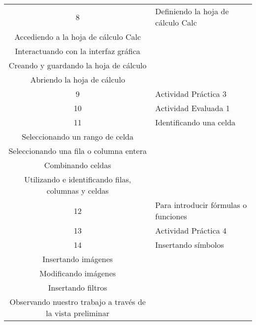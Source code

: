 \begin{center}
\begin{tabular}{|c|p{10cm}|}
                        \end{tabular}     
                        
                        \begin{tabular}{|c|p{10cm}|}\hline 

                        8 & \raggedright Definiendo la hoja de cálculo Calc
                        \\ Accediendo a la hoja de cálculo Calc
                        \\ Interactuando con la interfaz gráfica
                        \\ Creando y guardando la hoja de cálculo
                        \\ Abriendo la hoja de cálculo
                        \tabularnewline \hline
                                   
                        9 & \raggedright Actividad Práctica 3
                        \tabularnewline \hline
                        
                        10 & \raggedright Actividad Evaluada 1
                        \tabularnewline \hline
                        
                        11 & \raggedright Identificando una celda
                        \\ Seleccionando un rango de celda
                        \\ Seleccionando una fila o columna entera
                        \\ Combinando celdas
                        \\ Utilizando e identificando filas, columnas y celdas
                        \tabularnewline \hline
                        12 & \raggedright Para introducir fórmulas o funciones
                        \tabularnewline \hline
                        
                        13 & \raggedright Actividad Práctica 4
                        \tabularnewline \hline
                        
                        14 & \raggedright Insertando símbolos
                        \\ Insertando imágenes
                        \\ Modificando imágenes
                        \\ Insertando filtros
                        \\ Observando nuestro trabajo a través de la vista preliminar
                        \tabularnewline \hline
                        

\end{tabular}
\end{center}
